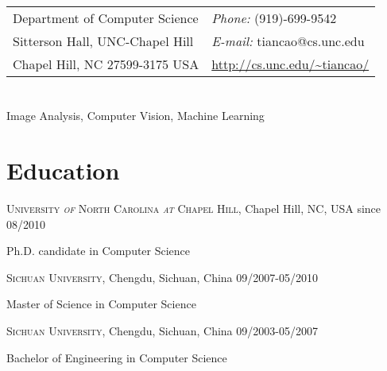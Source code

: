 \documentclass[line,margin]{res}
\newenvironment{list1}{
  \begin{list}{\ding{113}}{%
      \setlength{\itemsep}{0in}
      \setlength{\parsep}{0in} \setlength{\parskip}{0in}
      \setlength{\topsep}{0in} \setlength{\partopsep}{0in} 
      \setlength{\leftmargin}{0.17in}}}{\end{list}}
\begin{document}

\begin{resume}
\section{}
\vspace{.05in}
\begin{tabular}{@{}p{3in}p{3in}}
Department of Computer Science & {\it Phone:}  (919)-699-9542 \\            
Sitterson Hall, UNC-Chapel Hill & {\it E-mail:}  tiancao@cs.unc.edu \\
Chapel Hill, NC 27599-3175 USA&  \url{http://cs.unc.edu/~tiancao/} \\
\end{tabular}
 
\section{}       
\smallskip

Image Analysis, Computer Vision, Machine Learning

\section{\sc Education}
\smallskip

\textsc{University \textit{of} North Carolina \textit{at} Chapel Hill}, Chapel Hill, NC, USA \hfill{since 08/2010}\\
\vspace*{-.15in}
\begin{list1}
\item[] Ph.D. candidate in Computer Science %
\end{list1}
 \vspace*{-.15in}
\textsc{Sichuan University}, Chengdu, Sichuan, China \hfill {09/2007-05/2010}\\
\vspace*{-.15in}
\begin{list1}
\item[] Master of Science in Computer Science  %
\end{list1}
 \vspace*{-.15in}
\textsc{Sichuan University}, Chengdu, Sichuan, China \hfill{09/2003-05/2007}\\
 \vspace*{-.15in}
\begin{list1}
 \item[]  Bachelor of Engineering in Computer Science %
\end{list1}


\end{resume}
\end{document}

